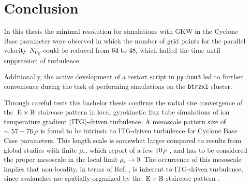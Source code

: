 
\chapter{Conclusion}
\label{chap:close}

\thispagestyle{empty}
\newpage

In this thesis the minimal resolution for simulations with GKW in the Cyclone Base parameter were observed in which the number of grid points for the parallel velocity $N_{\nu_\parallel}$ could be reduced from 64 to 48, which halfed the time until suppression of turbulence. \bigskip

Additionally, the active development of a restart script in \texttt{python3} led to further convenience during the task of performing simulations on the \texttt{btrzx1} cluster. \bigskip

Through careful tests this bachelor thesis confirms the radial size convergence of the $\mathrm{\:E}\times\mathrm{B}$ staircase pattern in local gyrokinetic flux tube simulations of ion temperature gradient (ITG)-driven turbulence.
A mesoscale pattern size of $\sim 57 - 76\,\rho$ is found to be intrinsic to ITG-driven turbulence for Cyclone Base Case parameters.
This length scale is somewhat larger compared to results from global studies with finite $\rho_\ast$, which report of a few $10\,\rho$ \cite{Pradalier2010}, and has to be considered the proper mesoscale in the local limit $\rho_\ast \rightarrow 0$.  
The occurrence of this mesoscale implies that non-locality, in terms of Ref. , is inherent to ITG-driven turbulence, since avalanches are spatially organized by the $\mathrm{\:E}\times\mathrm{B}$ staircase pattern \cite{McMillan2009, Pradalier2010, Rath2016, Peeters2016}. 
